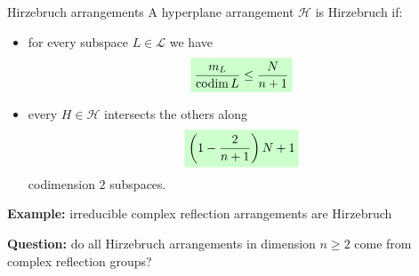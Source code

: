 \documentclass{beamer}
\newcommand{\mH}{\mathcal{H}}
\newcommand{\mL}{\mathcal{L}}
\DeclareMathOperator{\codim}{codim}
\newcommand{\mathcolorbox}[2]{\colorbox{#1}{$\displaystyle #2$}}
\begin{document}
\begin{frame}{Hirzebruch arrangements}
	A hyperplane arrangement \(\mH\) is Hirzebruch if:
	\begin{itemize}
		\item for every subspace \(L \in \mL\) we have
		\begin{equation*}
		\mathcolorbox{green!20}{
		\frac{m_L}{\codim L} \leq \frac{N}{n+1}
		} 
		\end{equation*}
		
		\item every \(H \in \mH\) intersects the others along
		\begin{equation*}
		\mathcolorbox{green!20}{
		\left( 1 - \frac{2}{n+1} \right) N + 1
		}
		\end{equation*}
		codimension \(2\) subspaces.
	\end{itemize}

	\textbf{Example:} irreducible complex reflection arrangements are Hirzebruch
	
	\textbf{Question:} do all Hirzebruch arrangements in dimension \(n \geq 2\) come from complex reflection groups?
\end{frame}
\end{document}
